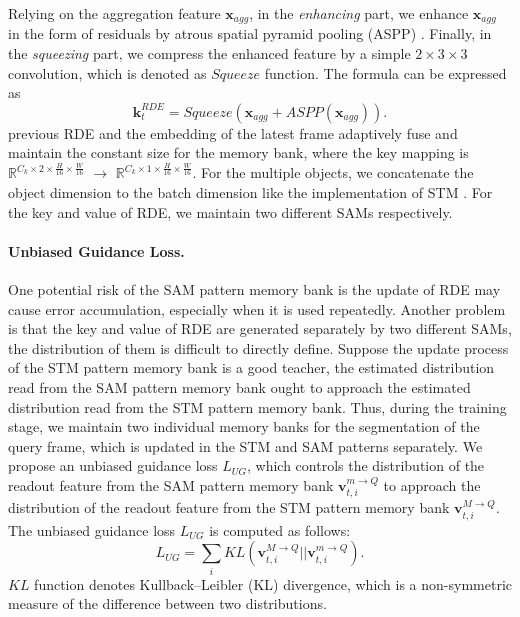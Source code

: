\documentclass[10pt,twocolumn,letterpaper]{article}
\begin{document}
Relying on the aggregation feature $\textbf{x}_{agg}$, in the \textit{enhancing} part, we enhance $\textbf{x}_{agg}$  in the form of residuals by atrous spatial pyramid pooling (ASPP) \cite{chen2017deeplab}. Finally, in the \textit{squeezing} part, we compress the enhanced feature by a simple $2\times 3\times 3$ convolution, which is denoted as  $Squeeze$ function. The formula can be expressed as
\begin{equation}
    \textbf{k}^{RDE}_t = Squeeze(\textbf{x}_{agg}+ASPP(\textbf{x}_{agg})).
\end{equation}
previous RDE and the embedding of the latest frame adaptively fuse and maintain the constant size for the memory bank, where the key mapping is $\mathbb{R}^{C_k \times 2 \times \frac{H}{16} \times \frac{W}{16}}$ $\rightarrow$ $\mathbb{R}^{C_k \times 1 \times \frac{H}{16} \times \frac{W}{16}}$. For the multiple objects, we concatenate the object dimension to the batch dimension like the implementation of STM \cite{oh2019video}. For the key and value of RDE, we maintain two different SAMs respectively.





\paragraph{Unbiased Guidance Loss.}
One potential risk of the SAM pattern memory bank is the update of RDE may cause error accumulation, especially when it is used repeatedly. Another problem is that the key and value of RDE are generated separately by two different SAMs, the distribution of them is difficult to directly define. Suppose the update process of the STM pattern memory bank is a good teacher, the estimated distribution read from the SAM pattern memory bank ought to approach the estimated distribution read from the STM pattern memory bank. 
Thus, during the training stage, we maintain two individual memory banks for the segmentation of the query frame, which is updated in the STM and SAM patterns separately.
We propose an unbiased guidance loss $L_{UG}$, which controls the distribution of the readout feature from the SAM pattern memory bank $\textbf{v}^{m \rightarrow Q}_{t,i}$ to approach the distribution of the readout feature from the STM pattern memory bank $\textbf{v}^{M \rightarrow Q}_{t,i}$. The unbiased guidance loss $L_{UG}$ is computed as follows:
\begin{equation}
L_{UG} = \sum_i  KL (\textbf{v}^{M \rightarrow Q}_{t,i} || \textbf{v}^{m \rightarrow Q}_{t,i}). 
    \label{eq:ugloss}
\end{equation}
$KL$ function denotes Kullback–Leibler (KL) divergence, which is a non-symmetric measure of the difference between two distributions.
\end{document}
